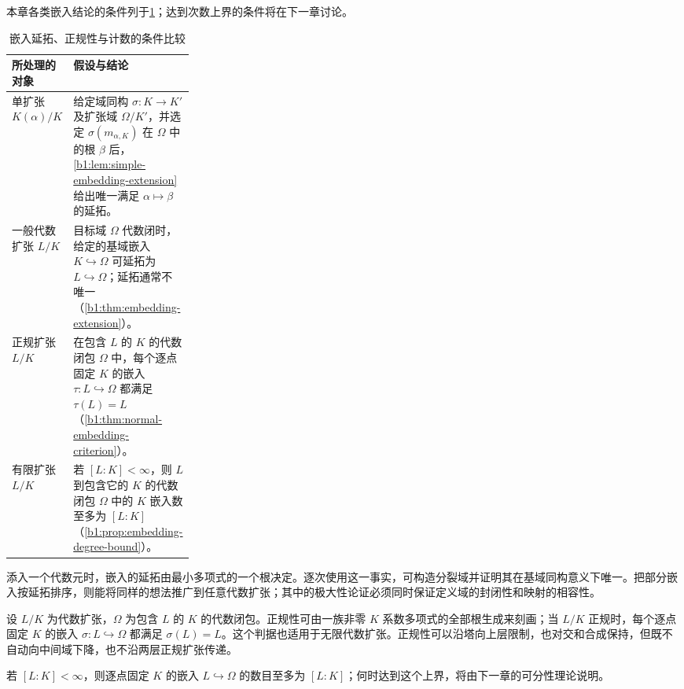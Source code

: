 \begin{samepage}
	本章各类嵌入结论的条件列于\cref{b1:tab:embedding-normality-count}；达到次数上界的条件将在下一章讨论。
	\begin{table}[H]
		\centering
		\small \caption{嵌入延拓、正规性与计数的条件比较}\label{b1:tab:embedding-normality-count}
		\begin{tabularx}{\linewidth}{@{}p{0.27\linewidth}X@{}}
			\toprule
			所处理的对象 & 假设与结论 \\
			\midrule
			单扩张 \(K(\alpha)/K\) & 给定域同构 \(\sigma:K\rightarrow K'\) 及扩张域 \(\Omega/K'\)，并选定 \(\sigma(m_{\alpha,K})\) 在 \(\Omega\) 中的根 \(\beta\) 后，\cref{b1:lem:simple-embedding-extension}给出唯一满足 \(\alpha\mapsto\beta\) 的延拓。 \\
			一般代数扩张 \(L/K\) & 目标域 \(\Omega\) 代数闭时，给定的基域嵌入 \(K\hookrightarrow\Omega\) 可延拓为 \(L\hookrightarrow\Omega\)；延拓通常不唯一（\cref{b1:thm:embedding-extension}）。 \\
			正规扩张 \(L/K\) & 在包含 \(L\) 的 \(K\) 的代数闭包 \(\Omega\) 中，每个逐点固定 \(K\) 的嵌入 \(\tau:L\hookrightarrow\Omega\) 都满足 \(\tau(L)=L\)（\cref{b1:thm:normal-embedding-criterion}）。 \\
			有限扩张 \(L/K\) & 若 \([L:K]<\infty\)，则 \(L\) 到包含它的 \(K\) 的代数闭包 \(\Omega\) 中的 \(K\) 嵌入数至多为 \([L:K]\)（\cref{b1:prop:embedding-degree-bound}）。 \\
			\bottomrule
		\end{tabularx}
	\end{table}
\end{samepage}

\begin{chaptersummary}
	添入一个代数元时，嵌入的延拓由最小多项式的一个根决定。逐次使用这一事实，可构造分裂域并证明其在基域同构意义下唯一。把部分嵌入按延拓排序，则能将同样的想法推广到任意代数扩张；其中的极大性论证必须同时保证定义域的封闭性和映射的相容性。

	\ProseParagraphBreak
	设 \(L/K\) 为代数扩张，\(\Omega\) 为包含 \(L\) 的 \(K\) 的代数闭包。正规性可由一族非零 \(K\) 系数多项式的全部根生成来刻画；当 \(L/K\) 正规时，每个逐点固定 \(K\) 的嵌入 \(\sigma:L\hookrightarrow\Omega\) 都满足 \(\sigma(L)=L\)。这个判据也适用于无限代数扩张。正规性可以沿塔向上层限制，也对交和合成保持，但既不自动向中间域下降，也不沿两层正规扩张传递。

	\ProseParagraphBreak
	若 \([L:K]<\infty\)，则逐点固定 \(K\) 的嵌入 \(L\hookrightarrow\Omega\) 的数目至多为 \([L:K]\)；何时达到这个上界，将由下一章的可分性理论说明。
\end{chaptersummary}

